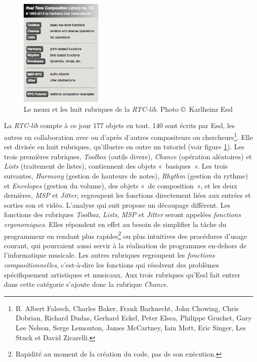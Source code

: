 \documentclass[a4paper,12pt]{article}
\newcommand{\guill}[1]{«~#1~»}
\begin{document}
\begin{figure}[!h]
\begin{center}
\includegraphics[width=4cm]{images/rtcmenu.png}
\caption{\footnotesize Le menu et les huit rubriques de la \emph{RTC-lib}. Photo \copyright~Karlheinz Essl}
\label{rtcmenu}
\end{center}
\end{figure}

La \emph{RTC-lib} compte à ce jour 177 objets en tout. 140 sont écrits par Essl, les autres en collaboration avec ou d'après d'autres compositeurs ou chercheurs\footnote{R. Albert Falesch, Charles Baker, Frank Barknecht, John Chowing, Chris Dobrian, Richard Dudas, Gerhard Eckel, Peter Elsea, Philippe Gruchet, Gary Lee Nelson, Serge Lemouton, James McCartney, Iain Mott, Eric Singer, Les Stuck et David Zicarelli.}. Elle est divisée en huit rubriques, qu'illustre en outre un tutoriel (voir figure \ref{rtcmenu}). Les trois premières rubriques, \emph{Toolbox} (outils divers), \emph{Chance} (opération aléatoires) et \emph{Lists} (traitement de listes), contiennent des objets \guill{basiques}. Les trois suivantes, \emph{Harmony} (gestion de hauteurs de notes), \emph{Rhythm} (gestion du rythme) et \emph{Envelopes} (gestion du volume), des objets \guill{de composition}, et les deux dernières, \emph{MSP} et \emph{Jitter}, regroupent les fonctions directement liées aux entrées et sorties son et vidéo. L'analyse qui suit propose un découpage différent. Les fonctions des rubriques \emph{Toolbox}, \emph{Lists}, \emph{MSP} et \emph{Jitter} seront appelées \emph{fonctions ergonomiques}. Elles répondent en effet au besoin de simplifier la tâche du programmeur en rendant plus rapides\footnote{Rapidité au moment de la création du code, pas de son exécution.} ou plus intuitives des procédures d'usage courant, qui pourraient aussi servir à la réalisation de programmes en-dehors de l'informatique musicale. Les autres rubriques regroupent les \emph{fonctions compositionnelles}, c'est-à-dire les fonctions qui résolvent des problèmes spécifiquement artistiques et musicaux. Aux trois rubriques qu'Essl fait entrer dans cette catégorie s'ajoute donc la rubrique \emph{Chance}.
\end{document}
